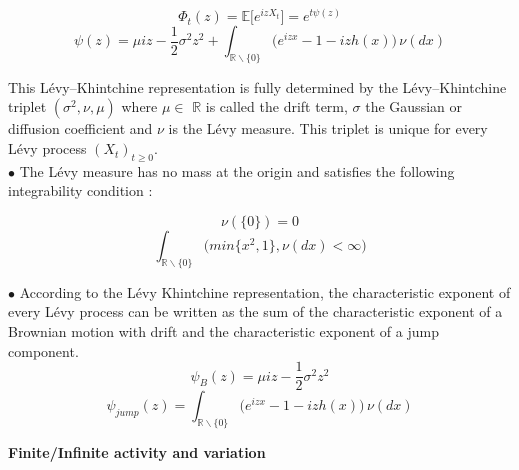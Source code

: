 \documentclass[12pt]{report}
\begin{document}
\begin{equation}
\Phi_t(z)=\mathbb{E}\Big[e^{iz X_t} \Big] =e^ {t \psi (z)}
\end{equation}
\begin{equation}
\psi (z)= \mu iz - \frac{1}{2}\sigma^2  z^2 + 
\int_{\mathbb{R}\backslash\{0\}} \big( e^{izx}-1 -iz h(x)\big)\,\nu(dx) 
\end{equation}

This Lévy–Khintchine representation is fully determined by the Lévy–Khintchine triplet $(\sigma^2,\nu, \mu)$ where $\mu \in $ $\mathbb{R}$ is called the drift term, $\sigma$ the Gaussian or diffusion
coefficient and $\nu$ is the Lévy measure. This triplet is unique for every Lévy process $(X_t)_{t\geq 0}$.\\
$\bullet$ The Lévy measure has no mass at the origin and satisfies the following integrability condition :
\begin{multicols}{2}\noindent
\begin{equation}
 \nu( \{0 \}) = 0
\end{equation}
\begin{equation}
\int_{\mathbb{R}\backslash\{0\}} \big( min \{x^2,1\} ,\nu(dx) < \infty  \Big)
\end{equation}
\end{multicols}

$\bullet$ According to the Lévy Khintchine representation, the characteristic exponent of every Lévy process can be written as the sum of the characteristic exponent of a Brownian motion with drift and the characteristic exponent of a jump component.
$$\psi_B (z)= \mu iz - \frac{1}{2}\sigma^2  z^2 $$
$$\psi_{jump}(z)=\int_{\mathbb{R}\backslash\{0\}} \big( e^{izx}-1 -iz h(x)\big)\,\nu(dx)$$

\textbf{Finite/Infinite activity and variation }\\
\end{document}
